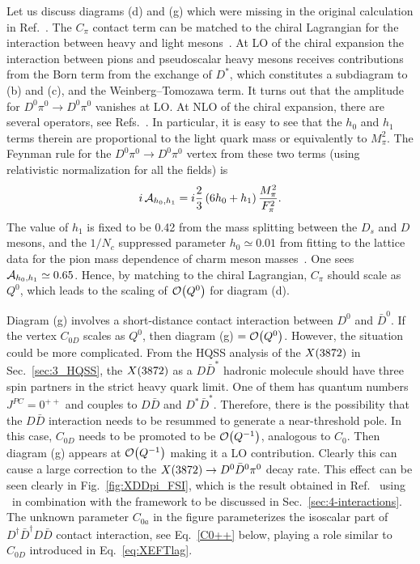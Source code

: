 Let us discuss diagrams (d) and (g) which were missing in the original 
calculation in Ref.~\cite{Fleming:2007rp}. The $C_\pi$ contact term can be 
matched to the chiral Lagrangian for the interaction between heavy and light 
mesons~\cite{Burdman:1992gh,Wise:1992hn,Yan:1992gz,Guo:2008gp}. At LO of the 
chiral expansion the interaction between pions and pseudoscalar heavy 
mesons receives contributions from the Born term from the exchange of $D^*$, 
which constitutes a subdiagram to (b) and (c), and the Weinberg--Tomozawa term. 
It turns out that the amplitude for $D^0\pi^0\to D^0\pi^0$ vanishes at LO. At 
NLO of the chiral expansion, there are several operators, see 
Refs.~\cite{Guo:2008gp,Guo:2009ct}.  In particular, it is easy to see that the 
$h_0$ and $h_1$ terms therein are proportional to the light quark mass or 
equivalently to $M_\pi^2$. The Feynman rule for the $D^0\pi^0\to D^0\pi^0$ vertex 
from these two terms (using relativistic normalization for all the fields) is
\begin{equation}
  i\,\mathcal{A}_{h_0,h_1} = i \frac{2}{3} \left(6h_0+h_1\right) 
\frac{M_\pi^2}{F_\pi^2} .
\end{equation}
The value of $h_1$ is fixed to be 0.42 from the mass splitting between the 
$D_s$ and $D$ mesons, and the $1/N_c$ suppressed parameter $h_0\simeq0.01$ from 
fitting to the lattice data for the pion mass dependence of charm meson 
masses~\cite{Liu:2012zya}. One sees $\mathcal{A}_{h_0,h_1}\simeq 0.65$. Hence, by 
matching to the chiral Lagrangian, $C_\pi$ should scale as $Q^0$, which leads 
to the scaling of $\mathcal{O}\!\left(Q^0\right)\!\,$ for diagram (d). 

Diagram (g) involves a short-distance contact interaction between $D^0$ and
$\bar D^0$. If the vertex $C_{0D}$ scales as $Q^0$, then diagram (g)
$=\mathcal{O}\!\left(Q^0\right)\!\,$. However, the situation could be more complicated. From the HQSS
analysis of the $X(3872)$ in Sec.~\ref{sec:3_HQSS}, the $X(3872)$ as a $D\bar D^*$
hadronic molecule should have three spin partners in the strict heavy quark
limit. One of them has quantum numbers $J^{PC}=0^{++}$ and couples to $D\bar D$
and $D^*\bar D^*$. Therefore, there is the possibility that the $D\bar D$
interaction needs to be resummed to generate a near-threshold pole. In this
case, $C_{0D}$ needs to be promoted to be $\mathcal{O}\!\left(Q^{-1}\right)\!\,$, analogous to $C_0$.
Then diagram (g) appears at $\mathcal{O}\!\left(Q^{-1} \right)\!\,$ making it a LO contribution.
Clearly this can cause a large correction to the $X(3872)\to D^0\bar D^0\pi^0$  decay
rate. This effect can be seen clearly in Fig.~\ref{fig:XDDpi_FSI}, which is the
result obtained in Ref.~\cite{Guo:2014hqa} using \nreft~in combination with the
framework to be discussed in Sec.~\ref{sec:4-interactions}. The unknown
parameter $C_{0a}$ in the figure parameterizes the isoscalar part of $D^\dag\bar
D^\dag D\bar D$ contact interaction, see Eq.~\eqref{C0++} below, playing a role
similar to $C_{0D}$ introduced in Eq.~\eqref{eq:XEFTlag}.

